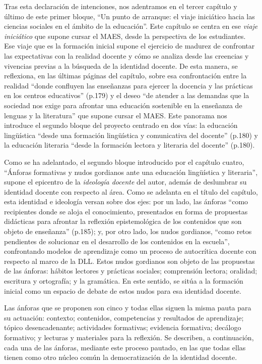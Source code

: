 \documentclass[spanish]{textolivre}
\begin{document}
Tras esta declaración de intenciones, nos adentramos en el tercer capítulo y último de este primer bloque, “Un punto de arranque: el viaje iniciático hacia las ciencias sociales en el ámbito de la educación”. Este capítulo se centra en ese \textit{viaje iniciático} que supone cursar el MAES, desde la perspectiva de los estudiantes. Ese viaje que es la formación inicial supone el ejercicio de madurez de confrontar las expectativas con la realidad docente y cómo se analiza desde las creencias y vivencias previas a la búsqueda de la identidad docente. De esta manera, se reflexiona, en las últimas páginas del capítulo, sobre esa confrontación entre la realidad “donde confluyen las enseñanzas para ejercer la docencia y las prácticas en los centros educativos” (p.179) y el deseo “de atender a las demandas que la sociedad nos exige para afrontar una educación sostenible en la enseñanza de lenguas y la literatura” que supone cursar el MAES. Este panorama nos introduce el segundo bloque del proyecto centrado en dos vías: la educación lingüística “desde una formación lingüística y comunicativa del docente” (p.180) y la educación literaria “desde la formación lectora y literaria del docente” (p.180).

Como se ha adelantado, el segundo bloque introducido por el capítulo cuatro, “Ánforas formativas y nudos gordianos ante una educación lingüística y literaria”, supone el epicentro de la \textit{ideología docente} del autor, además de deslumbrar su identidad docente con respecto al área. Como se adelanta en el título del capítulo, esta identidad e ideología versan sobre dos ejes: por un lado, las ánforas “como recipientes donde se aloja el conocimiento, presentados en forma de propuestas didácticas para afrontar la reflexión epistemológica de los contenidos que son objeto de enseñanza” (p.185); y, por otro lado, los nudos gordianos, “como retos pendientes de solucionar en el desarrollo de los contenidos en la escuela”, confrontando modelos de aprendizaje como un proceso de autocrítica docente con respecto al marco de la DLL. Estos nudos gordianos son objeto de las propuestas de las ánforas: hábitos lectores y prácticas sociales; comprensión lectora; oralidad; escritura y ortografía; y la gramática. En este sentido, se sitúa a la formación inicial como un espacio de debate de estos nudos para esa identidad docente.

Las ánforas que se proponen son cinco y todas ellas siguen la misma pauta para su actuación: contexto; contenidos, competencias y resultados de aprendizaje; tópico desencadenante; actividades formativas; evidencia formativa; decálogo formativo; y lecturas y materiales para la reflexión. Se describen, a continuación, cada una de las ánforas, mediante este proceso pautado, en las que todas ellas tienen como otro núcleo común la democratización de la identidad docente.
\end{document}

